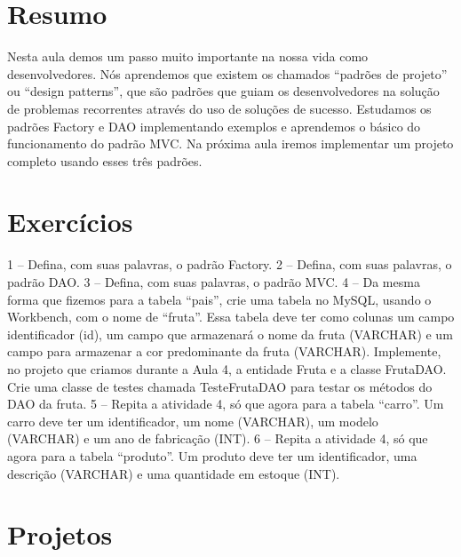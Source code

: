 \section{Resumo}

Nesta aula demos um passo muito importante na nossa vida como desenvolvedores. Nós aprendemos que existem os chamados ``padrões de projeto'' ou ``design patterns'', que são padrões que guiam os desenvolvedores na solução de problemas recorrentes através do uso de soluções de sucesso. Estudamos os padrões Factory e DAO implementando exemplos e aprendemos o básico do funcionamento do padrão MVC. Na próxima aula iremos implementar um projeto completo usando esses três padrões. 


\section{Exercícios}

1 – Defina, com suas palavras, o padrão Factory.
2 – Defina, com suas palavras, o padrão DAO.
3 – Defina, com suas palavras, o padrão MVC.
4 – Da mesma forma que fizemos para a tabela ``pais'', crie uma tabela no MySQL, usando o Workbench, com o nome de ``fruta''. Essa tabela deve ter como colunas um campo identificador (id), um campo que armazenará o nome da fruta (VARCHAR) e um campo para armazenar a cor predominante da fruta (VARCHAR). Implemente, no projeto que criamos durante a Aula 4, a entidade Fruta e a classe FrutaDAO. Crie uma classe de testes chamada TesteFrutaDAO para testar os métodos do DAO da fruta. 
5 – Repita a atividade 4, só que agora para a tabela ``carro''. Um carro deve ter um identificador, um nome (VARCHAR), um modelo (VARCHAR) e um ano de fabricação (INT).
6 – Repita a atividade 4, só que agora para a tabela ``produto''. Um produto deve ter um identificador, uma descrição (VARCHAR) e uma quantidade em estoque (INT).


\section{Projetos}
